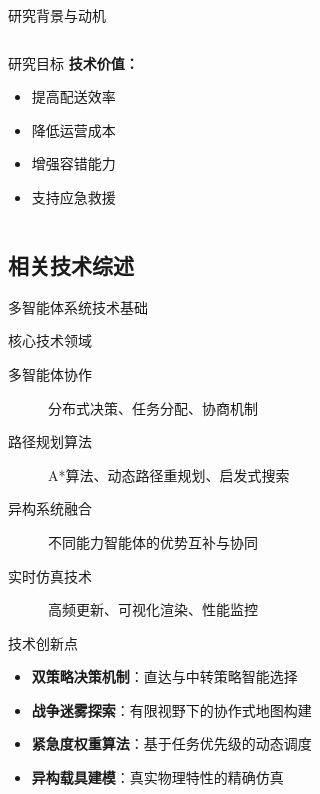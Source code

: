 \documentclass[
10pt,
aspectratio=169,
]{beamer}
\begin{document}
\begin{frame}{研究背景与动机}
\begin{columns}
\begin{column}{0.25\textwidth}
\begin{exampleblock}{研究目标}
                \textbf{技术价值：}
                \begin{itemize}
                    \item 提高配送效率
                    \item 降低运营成本
                    \item 增强容错能力
                    \item 支持应急救援
                \end{itemize}
            \end{exampleblock}
        \end{column}
    \end{columns}
\end{frame}

\subsection{相关技术综述}

\begin{frame}{多智能体系统技术基础}
    \begin{block}{核心技术领域}
        \begin{description}
            \item[多智能体协作] 分布式决策、任务分配、协商机制
            \item[路径规划算法] A*算法、动态路径重规划、启发式搜索
            \item[异构系统融合] 不同能力智能体的优势互补与协同
            \item[实时仿真技术] 高频更新、可视化渲染、性能监控
        \end{description}
    \end{block}
    
    \begin{alertblock}{技术创新点}
        \begin{itemize}
            \item \textbf{双策略决策机制}：直达与中转策略智能选择
            \item \textbf{战争迷雾探索}：有限视野下的协作式地图构建
            \item \textbf{紧急度权重算法}：基于任务优先级的动态调度
            \item \textbf{异构载具建模}：真实物理特性的精确仿真
        \end{itemize}
    \end{alertblock}
\end{frame}

\end{document}
